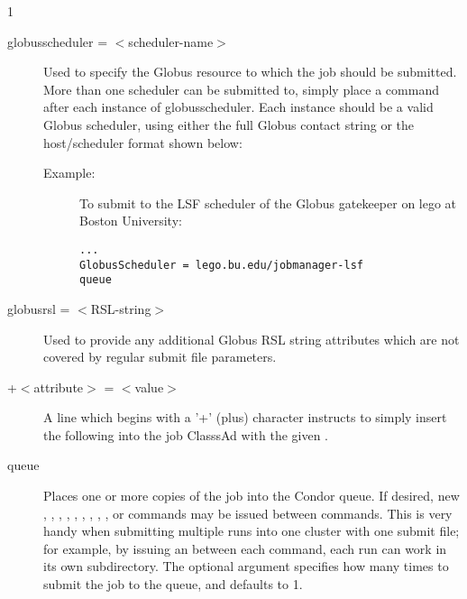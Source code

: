 \begin{ManPage}{\label{man-condor-submit}}{1}
\begin{description}

\item[globusscheduler = $<$scheduler-name$>$] Used to specify the 
Globus resource to which the job should be submitted. More than one scheduler
can be submitted to, simply place a  command after each instance
of globusscheduler. Each instance should be a valid Globus scheduler, using
either the full Globus contact string or the host/scheduler format shown below:
\begin{description}
\item[Example:]
To submit to the LSF scheduler of the Globus gatekeeper on lego at 
Boston University:
\begin{verbatim}
...
GlobusScheduler = lego.bu.edu/jobmanager-lsf
queue
\end{verbatim}
\end{description}


\item[globusrsl = $<$RSL-string$>$] Used to provide any additional Globus RSL
string attributes which are not covered by regular submit file parameters.


\item[+$<$attribute$>$ = $<$value$>$] A line which begins with a '+'
(plus) character instructs  to simply insert the
following  into the job ClasssAd with the given 
. 


\item[queue ] Places one or more
copies of the job into
the Condor queue. If desired, new , ,
, , , ,
, , , or 
commands may be issued between  commands. This is very handy
when submitting multiple runs into one cluster with one submit file; for
example, by issuing an  between each 
command, each run can work in its own subdirectory. The optional
argument  specifies how many times to submit the
job to the queue, and defaults to 1.


\end{description}
\end{ManPage}
